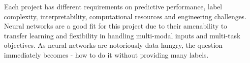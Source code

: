


Each project has different requirements on predictive performance, label complexity, interpretability, computational resources and engineering challenges.
Neural networks are a good fit for this project due to their amenability to transfer learning and flexibility in handling multi-modal inputs and multi-task objectives.
As neural networks are notoriously data-hungry, the question immediately becomes - how to do it without providing many labels.


